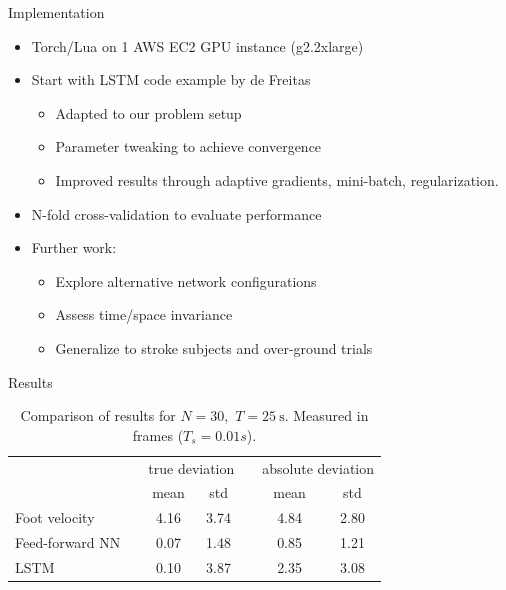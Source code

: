 \documentclass{beamer}
\newcommand{\ra}[1]{\renewcommand{\arraystretch}{#1}}
\begin{document}
\begin{frame}{Implementation}
    \begin{itemize}
        \item Torch/Lua on 1 AWS EC2 GPU instance (g2.2xlarge)
        \item Start with LSTM code example by de Freitas
        \begin{itemize}
            \item Adapted to our problem setup
            \item Parameter tweaking to achieve convergence
            \item Improved results through adaptive gradients, mini-batch, regularization.
        \end{itemize}
        \item N-fold cross-validation to evaluate performance
        \item Further work:
        \begin{itemize}
            \item Explore alternative network configurations
            \item Assess time/space invariance
            \item Generalize to stroke subjects and over-ground trials
        \end{itemize}
    \end{itemize}
\end{frame}

\begin{frame}{Results}
    \begin{table}[H]
        \begin{center}
        \ra{1.2}
        \begin{tabular}{@{} l c cc c cc@{}}
        \toprule
        && 
        \multicolumn{2}{c}{true deviation} 
        && 
        \multicolumn{2}{c}{absolute deviation} 
        \\
        \cmidrule{3-4} \cmidrule{6-7}
        {} && mean & std && mean & std \\
        \midrule
        Foot velocity   &&   4.16  &  3.74  &&  4.84  &  2.80 \\
        Feed-forward NN &&   0.07  &  1.48  &&  0.85  &  1.21 \\
        LSTM            &&   0.10  &  3.87  &&  2.35  &  3.08 \\
        \bottomrule
        \end{tabular}
        \caption
        {
            Comparison of results for
            \(
                N
                =
                30
                ,
            \)
            \(
                T
                =
                \SI
                {
                    25
                }
                {
                    \second
                }
                .
            \)
            Measured in frames ($T_s=0.01s$).
        }
        \end{center}
    \end{table}
\end{frame}
\end{document}
